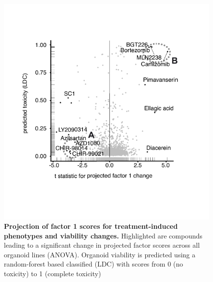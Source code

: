 \begin{flushleft}
\begin{figure}[h]
\centering
\includegraphics[scale=0.75,
                keepaspectratio]{figures/adenomaprofiling/pdf/fig_2_3.pdf}
\caption{\textbf{Projection of factor 1 scores for treatment-induced phenotypes and viability changes.} Highlighted are compounds leading to a significant change in projected factor scores across all organoid lines (ANOVA). Organoid viability is predicted using a random-forest based classified (LDC) with scores from 0 (no toxicity) to 1 (complete toxicity)}
\label{fig_180}
\end{figure}
\bigbreak



\end{flushleft}
